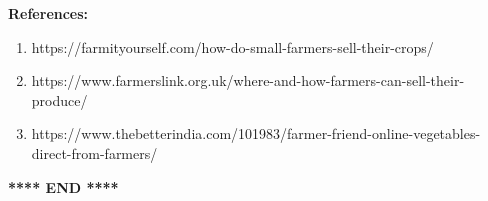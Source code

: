 \documentclass[12pt]{article}
\begin{document}
\noindent
{}

\noindent
\textbf{References:}
\begin{enumerate}
    \item https://farmityourself.com/how-do-small-farmers-sell-their-crops/
    \item https://www.farmerslink.org.uk/where-and-how-farmers-can-sell-their-produce/
    \item https://www.thebetterindia.com/101983/farmer-friend-online-vegetables-direct-from-farmers/
\end{enumerate}



\begin{center}
    \textbf{**** END ****}
\end{center}
\end{document}
